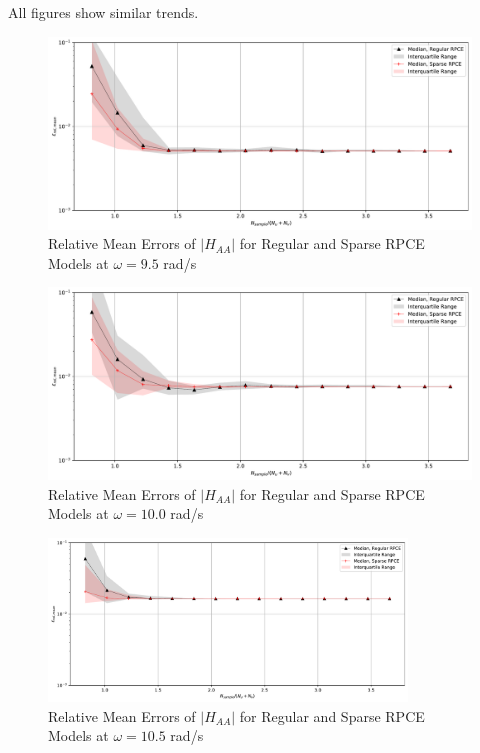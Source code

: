 All figures show similar trends.
\begin{figure}[H]
    \centering
    \includegraphics[width=1.0\textwidth]{
        plots/surrogate/plot_2_A_3.pdf
    }
    \caption{%
        Relative Mean Errors of $\left|H_{AA}\right|$ for Regular and Sparse RPCE Models at $\omega=9.5$ rad/s
    }
    \label{mean_sRPCE_A_A_3}
\end{figure}
\begin{figure}[H]
    \centering
    \includegraphics[width=1.0\textwidth]{
        plots/surrogate/plot_2_A_4.pdf
    }
    \caption{%
        Relative Mean Errors of $\left|H_{AA}\right|$ for Regular and Sparse RPCE Models at $\omega=10.0$ rad/s
    }
\end{figure}
\begin{figure}[H]
    \centering
    \includegraphics[width=0.85\textwidth]{
        plots/surrogate/plot_2_A_5.pdf
    }
    \caption{%
        Relative Mean Errors of $\left|H_{AA}\right|$ for Regular and Sparse RPCE Models at $\omega=10.5$ rad/s
    }
\end{figure}
